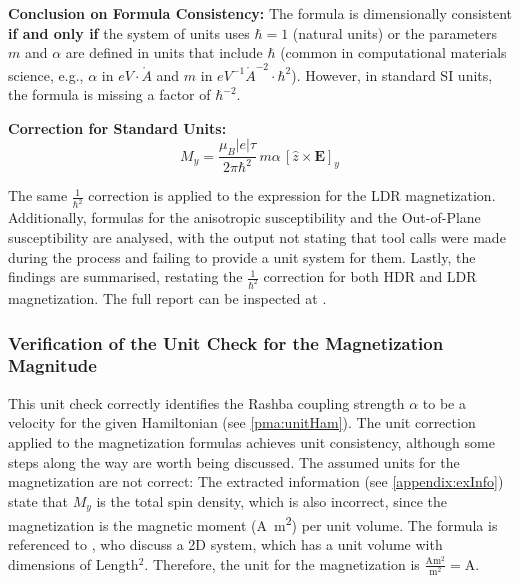 \documentclass[
	fontsize = 11pt,
	paper = a4,
	draft = false,
	twoside = true,
	titlepage = false
]{scrartcl}
\numberwithin{equation}{subsection}
\begin{document}
\begin{tcolorbox}[enhanced, breakable, title=Unit Correction for the HDR Magnetization as Stated in the Output, colback=blue!5!white, colframe=blue!75!black]
		\textbf{Conclusion on Formula Consistency:}
		The formula is dimensionally consistent \textbf{if and only if} the system of units uses $\hbar=1$ (natural units) or the parameters $m$ and $\alpha$ are defined in units that include $\hbar$ (common in computational materials science, e.g., $\alpha$ in $eV\cdot\mathring{A}$ and $m$ in $eV^{-1}\mathring{A}^{-2}\cdot \hbar^2$).
		However, in standard SI units, the formula is missing a factor of $\hbar^{-2}$.
		
		\textbf{Correction for Standard Units:}
		$$
		M_y = \frac{\mu_B |e|\tau}{2\pi\hbar^2}\,m\alpha\,[\hat{z}\times\mathbf{E}]_y
		$$
	\end{tcolorbox}
	The same $\frac{1}{\hbar^2}$ correction is applied to the expression for the LDR magnetization. Additionally, formulas for the anisotropic susceptibility and the Out-of-Plane susceptibility are analysed, with the output not stating that tool calls were made during the process and failing to provide a unit system for them. Lastly, the findings are summarised, restating the $\frac{1}{\hbar^2}$ correction for both HDR and LDR magnetization.
	The full report can be inspected at \autocite{gitUnit}.
	
	\subsubsection{Verification of the Unit Check for the Magnetization Magnitude} \label{appendix:unitVer}
	This unit check correctly identifies the Rashba coupling strength $\alpha$ to be a velocity for the given Hamiltonian (see \autoref{pma:unitHam}). The unit correction applied to the magnetization formulas achieves unit consistency, although some steps along the way are worth being discussed. The assumed units for the magnetization are not correct: The extracted information (see \autoref{appendix:exInfo}) state that $M_y$ is the total spin density, which is also incorrect, since the magnetization is the magnetic moment (\si{\ampere m^2}) per unit volume. The formula is referenced to \citeauthor{paper1_Gaiardoni_2025} \autocite{paper1_Gaiardoni_2025}, who discuss a 2D system, which has a unit volume with dimensions of Length$^2$. Therefore, the unit for the magnetization is $\frac{\si{\ampere \meter^2} }{\si{\meter^2}} = \si{\ampere}$.
	
\end{document}
